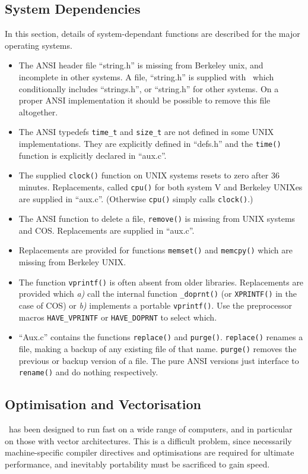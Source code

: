 \subsection{System Dependencies}
In this section, details of system-dependant functions are described
for the major operating systems.  
\begin{itemize}
\item The ANSI header file ``string.h''	is missing
from Berkeley unix, and incomplete in other systems.  A file,
``string.h'' is supplied with \moldy\  which conditionally includes
``strings.h'', or ``string.h'' for other systems. On a proper ANSI
implementation it should be possible to remove this file altogether.
\item The  ANSI typedefs \verb'time_t' and \verb'size_t' are not
defined in some UNIX implementations. They are explicitly defined in
``defs.h'' and the \verb'time()' function is explicitly declared in
``aux.c''.
\item The supplied \verb'clock()' function on UNIX systems resets to
zero after 36 minutes.  Replacements, called \verb'cpu()' for both
system V and Berkeley UNIXes are supplied in ``aux.c''. (Otherwise
\verb'cpu()' simply calls \verb'clock()'.)
\item The ANSI function to delete a file, \verb'remove()' is missing
from UNIX systems and COS.  Replacements are supplied in ``aux.c''.
\item Replacements are provided for functions \verb'memset()' and
\verb'memcpy()' which are missing from Berkeley UNIX.
\item The function \verb'vprintf()' is often absent from older
libraries. Replacements are provided which {\em a)} call the internal
function \verb'_doprnt()' (or  \verb'XPRINTF()' in the case of COS) or
{\em b)} implements a portable \verb'vprintf()'.  Use the preprocessor
macros  \verb'HAVE_VPRINTF' or \verb'HAVE_DOPRNT' to select which.
\item ``Aux.c'' contains the functions \verb'replace()' and \verb'purge()'.
\verb'replace()' renames a file, making a backup of any existing file
of that name. \verb'purge()' removes the previous or backup version of
a file.  The pure ANSI versions just interface to \verb'rename()' and
do nothing respectively.
\end{itemize}

\subsection{Optimisation and Vectorisation}
\moldy\  has been designed to run fast on a wide range of computers, and
in particular on those with vector architectures. This is a difficult
problem, since necessarily machine-specific compiler directives and
optimisations are required for ultimate performance, and inevitably
portability must be sacrificed to gain speed.

